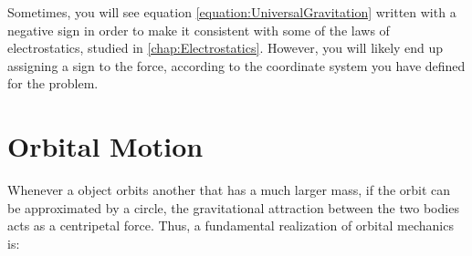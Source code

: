 	
	Sometimes, you will see equation \ref{equation:UniversalGravitation} written with a negative sign in order to make it consistent with some of the laws of electrostatics, studied in \autoref{chap:Electrostatics}. However, you will likely end up assigning a sign to the force, according to the coordinate system you have defined for the problem. 
	
	
	
	
	
	\section{Orbital Motion} 
	Whenever a object orbits another that has a much larger mass, if the orbit can be approximated by a circle, the gravitational attraction between the two bodies acts as a centripetal force.  Thus, a fundamental realization of orbital mechanics is:
	

		


	


